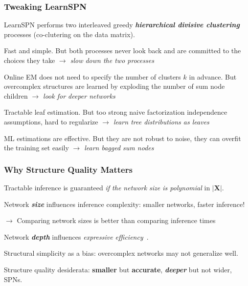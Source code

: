 \documentclass[10pt, t, xcolor={usenames,dvipsnames,svgnames}, compress]{beamer}
\begin{document}
\begin{frame}
  \frametitle{Tweaking LearnSPN}
  
  \textsf{LearnSPN} performs two interleaved greedy
  \textbf{\emph{hierarchical divisive clustering}}
  processes (co-clutering on the data matrix).\par\bigskip

  Fast and simple. But both processes never look back and are
  committed to the choices they take \emph{$\rightarrow$ slow down the two
  processes}\par\bigskip

  Online EM does not need to specify the number of clusters $k$ in
  advance. But overcomplex structures are learned by exploding the number of sum
  node children \emph{$\rightarrow$ look for deeper networks}\par\bigskip

  Tractable leaf estimation. But too strong naive factorization independence
  assumptions, hard to regularize \emph{$\rightarrow$ learn tree
    distributions as leaves}\par\bigskip

  ML estimations are effective. But they are not robust to noise, they
  can overfit the training set easily
  \emph{$\rightarrow$ learn bagged sum nodes}
\end{frame}

\begin{frame}
  \frametitle{Why Structure Quality Matters}

  Tractable inference is guaranteed \emph{if the network size is polynomial} in $|\mathbf{X}|$.\par\bigskip

  Network \emph{\textbf{size}} influences inference complexity: smaller networks,
  faster inference!\par
  $\rightarrow$ Comparing network sizes is better than comparing inference times\par\bigskip

  Network \emph{\textbf{depth}} influences \emph{expressive efficiency}~\emph{\parencite{Martens2014,Zhao2015}}.\par\bigskip

  Structural simplicity as a bias: overcomplex networks may not generalize well.\par\bigskip
  
  Structure quality desiderata: \textbf{\textbf{smaller}} but \textbf{\textbf{accurate}}, \textbf{\emph{deeper}} but not
  wider, SPNs.
\end{frame}
\end{document}
